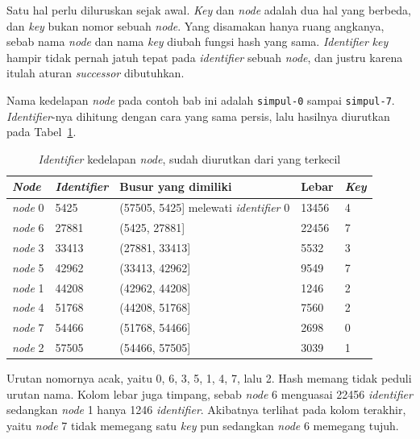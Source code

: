 Satu hal perlu diluruskan sejak awal. \textit{Key} dan \textit{node} adalah dua hal
yang berbeda, dan \textit{key} bukan nomor sebuah \textit{node}. Yang disamakan hanya
ruang angkanya, sebab nama \textit{node} dan nama \textit{key} diubah fungsi hash yang
sama. \textit{Identifier} \textit{key} hampir tidak pernah jatuh tepat pada \textit{identifier} sebuah
\textit{node}, dan justru karena itulah aturan
\textit{successor} dibutuhkan.

Nama kedelapan \textit{node} pada contoh bab ini adalah \texttt{simpul-0} sampai
\texttt{simpul-7}. \textit{Identifier}-nya dihitung dengan cara yang sama persis, lalu hasilnya
diurutkan pada Tabel~\ref{tab:titik-node}.

\begin{table}[htbp]
  \centering
  \caption{\textit{Identifier} kedelapan \textit{node}, sudah diurutkan dari yang terkecil}
  \label{tab:titik-node}
  \begin{tabularx}{\textwidth}{|l|l|X|l|l|}
    \hline
    \textbf{\textit{Node}} & \textbf{\textit{Identifier}} & \textbf{Busur yang dimiliki} & \textbf{Lebar} & \textbf{\textit{Key}} \\
    \hline
    \textit{node} 0 & 5425 & (57505, 5425] melewati \textit{identifier} 0 & 13456 & 4 \\
    \hline
    \textit{node} 6 & 27881 & (5425, 27881] & 22456 & 7 \\
    \hline
    \textit{node} 3 & 33413 & (27881, 33413] & 5532 & 3 \\
    \hline
    \textit{node} 5 & 42962 & (33413, 42962] & 9549 & 7 \\
    \hline
    \textit{node} 1 & 44208 & (42962, 44208] & 1246 & 2 \\
    \hline
    \textit{node} 4 & 51768 & (44208, 51768] & 7560 & 2 \\
    \hline
    \textit{node} 7 & 54466 & (51768, 54466] & 2698 & 0 \\
    \hline
    \textit{node} 2 & 57505 & (54466, 57505] & 3039 & 1 \\
    \hline
  \end{tabularx}
\end{table}

Urutan nomornya acak, yaitu 0, 6, 3, 5, 1, 4, 7, lalu 2. Hash memang tidak
peduli urutan nama. Kolom lebar juga timpang, sebab \textit{node} 6 menguasai
22456 \textit{identifier} sedangkan \textit{node} 1 hanya 1246 \textit{identifier}. Akibatnya terlihat pada
kolom terakhir, yaitu \textit{node} 7 tidak memegang satu \textit{key} pun sedangkan
\textit{node} 6 memegang tujuh.

